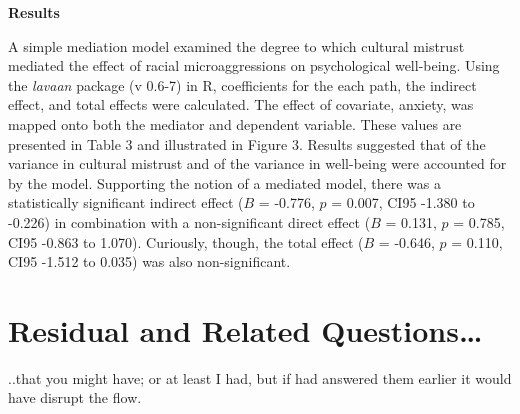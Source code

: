 \documentclass[
  11pt,
]{book}
\begin{document}
\textbf{Results}

A simple mediation model examined the degree to which cultural mistrust mediated the effect of racial microaggressions on psychological well-being. Using the \emph{lavaan} package (v 0.6-7) in R, coefficients for the each path, the indirect effect, and total effects were calculated. The effect of covariate, anxiety, was mapped onto both the mediator and dependent variable. These values are presented in Table 3 and illustrated in Figure 3. Results suggested that of the variance in cultural mistrust and of the variance in well-being were accounted for by the model. Supporting the notion of a mediated model, there was a statistically significant indirect effect (\(B\) = -0.776, \(p\) = 0.007, CI95 -1.380 to -0.226) in combination with a non-significant direct effect (\(B\) = 0.131, \(p\) = 0.785, CI95 -0.863 to 1.070). Curiously, though, the total effect (\(B\) = -0.646, \(p\) = 0.110, CI95 -1.512 to 0.035) was also non-significant.

\hypertarget{residual-and-related-questions}{%
\section{Residual and Related Questions\ldots{}}\label{residual-and-related-questions}}

..that you might have; or at least I had, but if had answered them earlier it would have disrupt the flow.
\end{document}
